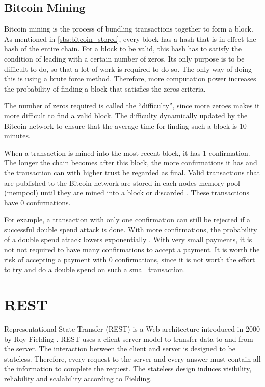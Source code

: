 \subsection{Bitcoin Mining}
\label{sbs:bitcoin_mining}

Bitcoin mining is the process of bundling transactions together to form a block. As mentioned in \ref{sbs:bitcoin_stored}, every block has a hash that is in effect the hash of the entire chain. For a block to be valid, this hash has to satisfy the condition of leading with a certain number of zeros. Its only purpose is to be difficult to do, so that a lot of work is required to do so. The only way of doing this is using a brute force method. Therefore, more computation power increases the probability of finding a block that satisfies the zeros criteria. 

The number of zeros required is called the ``difficulty'', since more zeroes makes it more difficult to find a valid block. The difficulty dynamically updated by the Bitcoin network to ensure that the average time for finding such a block is 10 minutes.

When a transaction is mined into the most recent block, it has 1 confirmation. The longer the chain becomes after this block, the more confirmations it has and the transaction can with higher trust be regarded as final. Valid transactions that are published to the Bitcoin network are stored in each nodes memory pool (mempool) until they are mined into a block or discarded \cite{bitcoinOrg}. These transactions have 0 confirmations. 

For example, a transaction with only one confirmation can still be rejected if a successful double spend attack is done. With more confirmations, the probability of a double spend attack lowers exponentially \cite{Nakamoto2008}. With very small payments, it is not  not required to have many confirmations to accept a payment. It is worth the risk of accepting a payment with 0 confirmations, since it is not worth the effort to try and do a double spend on such a small transaction.

\section{REST}
\label{rest}

Representational State Transfer (REST) is a Web architecture introduced in 2000 by Roy Fielding \cite{Fielding2000}. REST uses a client-server model to transfer data to and from the server. The interaction between the client and server is designed to be stateless. Therefore, every request to the server and every answer must contain all the information to complete the request. The stateless design induces visibility, reliability and scalability according to Fielding\cite{Fielding2000}.

